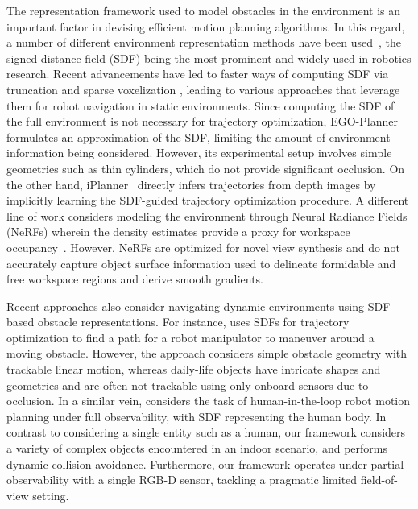 \documentclass[letterpaper, 10 pt, conference]{ieeeconf}  %
\begin{document}
The representation framework used to model obstacles in the environment is an important factor in devising efficient motion planning algorithms.
In this regard, a number of different environment representation methods have been used~\cite{oleynikova2016signed, mildenhall2021nerf, nfomp2022, ni2022ntfields}, the signed distance field (SDF) being the most prominent and widely used in robotics research.
Recent advancements have led to faster ways of computing SDF via truncation and sparse voxelization \cite{pan2022voxfield, oleynikova2017voxblox, han2019fiesta}, leading to various approaches that leverage them for robot navigation in static environments.
Since computing the SDF of the full environment is not necessary for trajectory optimization, EGO-Planner \cite{zhou2020ego} formulates an approximation of the SDF, limiting the amount of environment information being considered.
However, its experimental setup involves simple geometries such as thin cylinders, which do not provide significant occlusion.
On the other hand, iPlanner~\cite{yang2023iplanner} directly infers trajectories from depth images by implicitly learning the SDF-guided trajectory optimization procedure.
A different line of work considers modeling the environment through Neural Radiance Fields (NeRFs) wherein the density estimates provide a proxy for workspace occupancy~\cite{adamkiewicz2022vision}.
However, NeRFs are optimized for novel view synthesis and do not accurately capture object surface information used to delineate formidable and free workspace regions and derive smooth gradients.

Recent approaches also consider navigating dynamic environments using SDF-based obstacle representations.
For instance, \cite{finean2021predicted} uses SDFs for trajectory optimization to find a path for a robot manipulator to maneuver around a moving obstacle.
However, the approach considers simple obstacle geometry with trackable linear motion, whereas daily-life objects have intricate shapes and geometries and are often not trackable using only onboard sensors due to occlusion.
In a similar vein, \cite{liu2022regularized} considers the task of human-in-the-loop robot motion planning under full observability, with SDF representing the human body.
In contrast to considering a single entity such as a human, our framework considers a variety of complex objects encountered in an indoor scenario, and performs dynamic collision avoidance.
Furthermore, our framework operates under partial observability with a single RGB-D sensor, tackling a pragmatic limited field-of-view setting.
\end{document}
